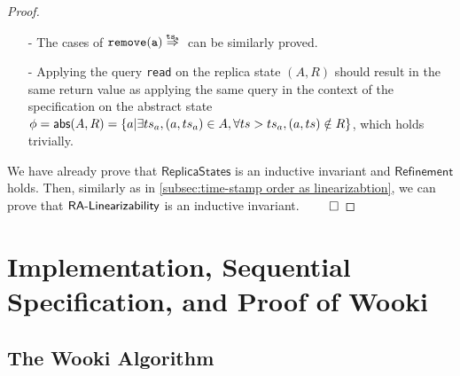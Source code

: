 \begin {proof}
\begin{itemize}
    By the causal delivery assumption, if $\alabel$ is visible to an operation $\alabel'$, then the effector of $\alabel'$ has not been applied in $S'$ yet; if an operation $\alabel''$ is visible to $\alabel$, then the effector of $\alabel''$ has already been applied in $S'$. By Annotation1 of effector $(A'',R'')$, and Annotation2 of replica state $S$, we can see that $A'' \setminus \{ (a,\ats_a) \} \subseteq A$ and $R'' \subseteq R$, and thus, we can see that $A' = A \cup \{ (a,\ats_a) \}$ and $R' = R$.

    Since $\ats_a$ is greater than all the timestamps of operations whose effector have been applied in $S$, by Annotation2 of $S$, we can see that, for each $\ats \in \{ \ats' \vert (\_,\ats') \in S \}$, we have $\ats < \ats_a$. Therefore, we can see that $\refmap(A',R') = \refmap(A,R) \cup \{ a \} = \abstate'$.

\item[-] The cases of $\alabellongind[{\tt remove}]{a}{}{\ats_a}{}$ can be similarly proved.

\item[-] Applying the query {\tt read} on the replica state $(A,R)$ should result in the same return value as applying the same query in the context of the specification on the abstract state $\phi = \mathsf{abs}(A,R) = \{ a \vert \exists ts_a, (a,ts_a) \in A, \forall ts > ts_a, (a,ts) \notin R \}$, which holds trivially. 
\end{itemize}


We have already prove that $\mathsf{ReplicaStates}$ is an inductive invariant and $\mathsf{Refinement}$ holds. Then, similarly as in \sectionautorefname \ref{subsec:time-stamp order as linearizabtion}, we can prove that $\mathsf{RA\text{-}Linearizability{}}$ is an inductive invariant. $\qed$
\end {proof}






\section{Implementation, Sequential Specification, and Proof of Wooki}
\label{sec:implementation, sequential specification, and proof of wooki}



\subsection{The Wooki Algorithm}
\label{subsec:the Wooki algorithm}


